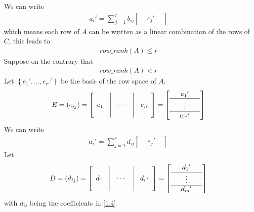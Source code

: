 \documentclass[a4paper,oneside]{book}
\numberwithin{equation}{chapter}
\begin{document}
We can write
\begin{align}
{a_i}' = \sum\limits_{j = 1}^r {{b_{ij}}\left[ {\begin{array}{*{20}{c}}
{}&{{c_j}'}&{}
\end{array}} \right]} 
\end{align}
which means each row of $A$ can be written as a linear combination of the rows of $C$, this leads to
\begin{align}
row\_rank\left( A\right) \le r
\end{align}
Suppose on the contrary that 
\begin{align}
row\_rank\left( A\right) < r
\end{align}
Let $\left\{ {{e_1}', \ldots ,{e_{r'}}'} \right\}$ be the basis of the row space of $A$, 
\begin{equation}
E = \left( {{e_{ij}}} \right) = \left[ {\begin{array}{*{20}{c}}
{}&\vline& {}&\vline& {}\\
{{e_1}}&\vline&  \cdots &\vline& {{e_n}}\\
{}&\vline& {}&\vline& {}
\end{array}} \right] = \left[ {\begin{array}{*{20}{c}}
{}&{{e_1}'}&{}\\
\hline
{}& \vdots &{}\\
\hline
{}&{{e_{r'}}'}&{}
\end{array}} \right]
\end{equation}
We can write
\begin{align}
\label{1.4}
{a_i}' = \sum\limits_{j = 1}^r {{d_{ij}}\left[ {\begin{array}{*{20}{c}}
{}&{{e_j}'}&{}
\end{array}} \right]} 
\end{align}
Let 
\begin{align}
D = \left( {{d_{ij}}} \right) = \left[ {\begin{array}{*{20}{c}}
{}&\vline& {}&\vline& {}\\
{{d_1}}&\vline&  \cdots &\vline& {{d_{r'}}}\\
{}&\vline& {}&\vline& {}
\end{array}} \right] = \left[ {\begin{array}{*{20}{c}}
{}&{{d_1}'}&{}\\
\hline
{}& \vdots &{}\\
\hline
{}&{{d_m}'}&{}
\end{array}} \right]
\end{align}
with $d_{ij}$ being the coefficients in \eqref{1.4}.
\end{document}
